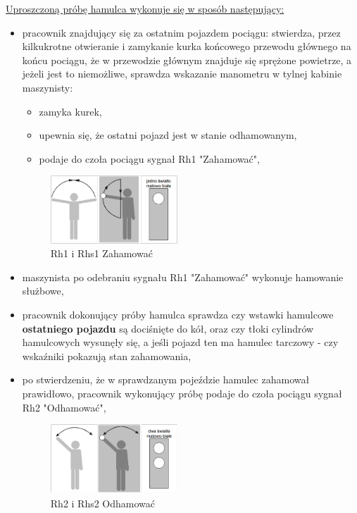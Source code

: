 \underline{Uproszczoną próbę hamulca wykonuje się w sposób następujący:} 
\begin{itemize}
	\item pracownik znajdujący się za ostatnim pojazdem pociągu: stwierdza, przez kilkukrotne otwieranie i zamykanie kurka końcowego przewodu głównego na końcu pociągu, że w przewodzie głównym znajduje się sprężone powietrze, a jeżeli jest to niemożliwe, sprawdza wskazanie manometru w tylnej kabinie maszynisty: 
	\begin{itemize}
		\item zamyka kurek, 
		\item upewnia się, że ostatni pojazd jest w stanie odhamowanym, 
		\item podaje do czoła pociągu sygnał Rh1 "Zahamować", 
	\end{itemize}
\begin{figure}
	\includegraphics[width=0.45\textwidth]{skryptkierownik-img/skryptkierownik-img069.png}
	\caption{Rh1 i Rhs1 Zahamować}
\end{figure}
	\item maszynista po odebraniu sygnału Rh1 "Zahamować" wykonuje hamowanie służbowe, 
	\item pracownik dokonujący próby hamulca sprawdza czy wstawki hamulcowe \textbf{ostatniego pojazdu} są dociśnięte do kół, oraz czy tłoki cylindrów hamulcowych wysunęły się, a jeśli pojazd ten ma hamulec tarczowy - czy wskaźniki pokazują stan zahamowania, 
	\item po stwierdzeniu, że w sprawdzanym pojeździe hamulec zahamował prawidłowo, pracownik wykonujący próbę podaje do czoła pociągu sygnał Rh2 "Odhamować",
\begin{figure}
	\includegraphics[width=0.45\textwidth]{skryptkierownik-img/skryptkierownik-img067.png}
	\caption{Rh2 i Rhs2 Odhamować}
\end{figure}


\end{itemize}
